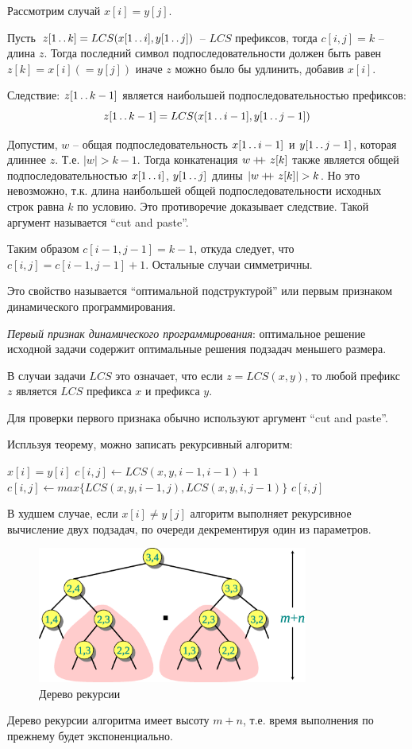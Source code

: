\documentclass[a4paper,11pt]{article}
\newcommand\doubleplus{+\kern-1.3ex+\kern0.8ex}
\begin{document}
Рассмотрим случай $x[i] = y[j]$.

Пусть $z[1 \mathinner{\ldotp\ldotp} k] = LCS(x[1 \mathinner{\ldotp\ldotp} i], y[1 \mathinner{\ldotp\ldotp} j])$ -- $LCS$
префиксов, тогда $c[i, j] = k$ -- длина $z$. Тогда последний символ
подпоследовательности должен быть равен $z[k] = x[i] (= y[j])$ иначе $z$
можно было бы удлинить, добавив $x[i]$.

Следствие: $z[1 \mathinner{\ldotp\ldotp} k-1]$ является наибольшей подпоследовательностью
префиксов: 
\begin{equation*}
  z[1 \mathinner{\ldotp\ldotp} k-1] = LCS(x[1 \mathinner{\ldotp\ldotp} i-1], y[1 \mathinner{\ldotp\ldotp} j-1])  
\end{equation*}

Допустим, $w$ -- общая подпоследовательность $x[1 \mathinner{\ldotp\ldotp} i-1]$ и
$y[1 \mathinner{\ldotp\ldotp} j-1]$, которая длиннее $z$. Т.е. $|w| > k-1$. Тогда конкатенация
$w \doubleplus z[k]$ также является общей подпоследовательностью 
$x[1 \mathinner{\ldotp\ldotp} i]$, $y[1 \mathinner{\ldotp\ldotp} j]$ длины $|w \doubleplus z[k]| > k$.
Но это невозможно, т.к. длина наибольшей общей подпоследовательности
исходных строк равна $k$ по условию. Это противоречие доказывает следствие.
Такой аргумент называется ``cut and paste''.

Таким образом $c[i-1, j-1] = k-1$, откуда следует, что $c[i, j] = 
c[i-1, j-1] +1$. Остальные случаи симметричны.

Это свойство называется ``оптимальной подструктурой'' или первым признаком
динамического программирования.

\emph{Первый признак динамического программирования}: оптимальное решение
исходной задачи содержит оптимальные решения подзадач меньшего размера.

В случаи задачи $LCS$ это означает, что если $z = LCS(x, y)$, то любой
префикс $z$ является $LCS$ префикса $x$ и префикса $y$.

Для проверки первого признака обычно используют аргумент ``cut and paste''.

Испльзуя теорему, можно записать рекурсивный алгоритм:
\begin{codebox}
\li \If $x[i] = y[i]$
\li   \Then $c[i,j] \gets LCS(x, y, i-1, i-1)+1$
\li   \Else $c[i,j] \gets max\{LCS(x, y, i-1, j), LCS(x, y, i, j-1)\}$
    \End
\li \Return $c[i,j]$
\end{codebox}
В худшем случае, если $x[i] \neq y[j]$ алгоритм выполняет рекурсивное 
вычисление двух подзадач, по очереди декрементируя один из параметров.
\begin{figure}[h!]
  \centering
  \includegraphics[width=3.5in]{lecture8/tree.eps}
  \caption{Дерево рекурсии}
\end{figure}
Дерево рекурсии алгоритма имеет высоту $m+n$, т.е. время выполнения по 
прежнему будет экспоненциально.
\end{document}
